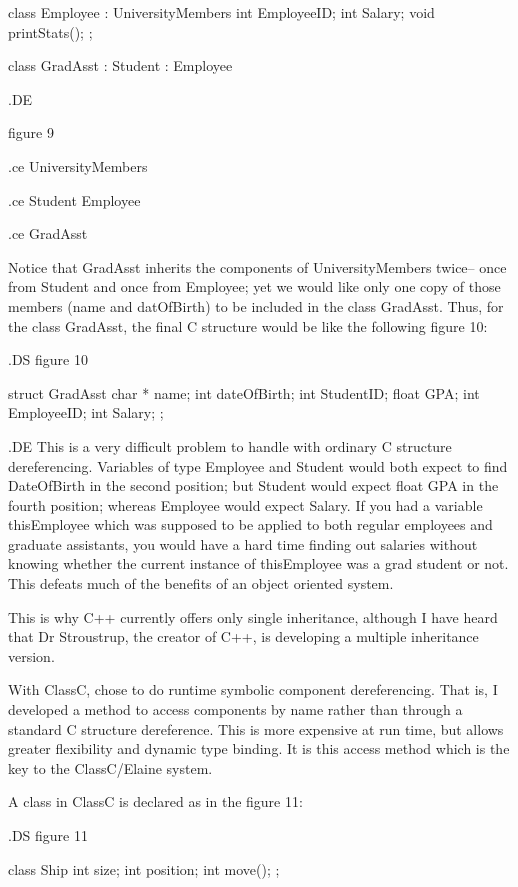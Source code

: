 class Employee : UniversityMembers
    {
	int	EmployeeID;
	int	Salary;
	void	printStats();
    }	;

class GradAsst : Student : Employee

.DE


figure 9


.ce
UniversityMembers



.ce
Student			Employee



.ce
GradAsst


Notice that GradAsst inherits the components of UniversityMembers twice--
once from Student and once from Employee; yet we would like only one copy
of those members (name and datOfBirth) to be included in the class
GradAsst.  Thus, for the class GradAsst, the final C structure would
be like the following figure 10:


.DS
figure 10

struct GradAsst
    {
	char *	name;
	int	dateOfBirth;
	int	StudentID;
   	float	GPA;
	int	EmployeeID;
	int	Salary;
    }	;

.DE
This is a very difficult problem to handle with ordinary C
structure dereferencing.  Variables of type Employee and Student would
both expect to find DateOfBirth in the second position; but Student
would expect float GPA in the fourth position; whereas Employee would
expect Salary.  If you had a variable thisEmployee which was supposed to 
be applied to both regular employees and graduate assistants, you
would have a hard time finding out salaries without knowing whether the
current instance of thisEmployee was a grad student or not.  This defeats
much of the benefits of an object oriented system.

This is why C++ currently offers only single
inheritance, although I have heard that Dr Stroustrup, the creator of C++,
is developing a multiple inheritance version.


With ClassC, chose to do runtime symbolic component dereferencing.  That is, 
I developed a method to access components by name rather
than through a standard C structure dereference.  This is more
expensive at run time, but allows greater flexibility and dynamic type
binding.  It is this access method which is the key to the ClassC/Elaine
system.

A class in ClassC is declared as in the figure 11:

.DS
figure 11

class Ship
    {
	int	size;
	int	position;
	int	move();
    }	;


